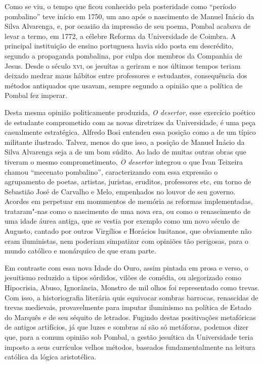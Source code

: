 Como se viu, o tempo que ficou conhecido pela posteridade como ``período
pombalino'' teve início em 1750, um ano após o nascimento de Manuel Inácio da
Silva Alvarenga, e, por ocasião da impressão de seu poema, Pombal acabava de
levar a termo, em 1772, a célebre Reforma da Universidade de Coimbra. A
principal instituição de ensino portuguesa havia sido posta em descrédito,
segundo a propaganda pombalina, por culpa dos membros da Companhia de Jesus.
Desde o século \textsc{xvi}, os jesuítas a geriram e nos últimos tempos teriam
deixado medrar maus hábitos entre professores e estudantes, consequência dos
métodos antiquados que usavam, sempre segundo a opinião que a política de Pombal
fez imperar. 

Desta mesma opinião politicamente produzida, \textit{O desertor},
esse exercício poético de estudante comprometido com as novas diretrizes da
Universidade, é uma peça casualmente estratégica. Alfredo Bosi entendeu essa
posição como a de um típico militante ilustrado. Talvez, menos do que isso, a
posição de Manuel Inácio da Silva Alvarenga seja a de um bom súdito.  Ao lado de
muitas outras obras que tiveram o mesmo comprometimento, \textit{O desertor}
integrou o que Ivan Teixeira chamou ``mecenato pombalino'', caracterizando com
essa expressão o agrupamento de poetas, artistas, juristas, eruditos,
professores etc, em torno de Sebastião José de Carvalho e Melo, empenhados no
louvor de seu governo.  Acordes em perpetuar em monumentos de memória as
reformas implementadas, trataram"-nas como o nascimento de uma nova era, ou como
o renascimento de uma idade áurea antiga, que se vestia por exemplo como um novo
século de Augusto, cantado por outros Virgílios e Horácios lusitanos, que
obviamente não eram iluministas, nem poderiam simpatizar com opiniões tão
perigosas, para o mundo católico e monárquico de que eram parte.

Em contraste com essa nova Idade do Ouro, assim pintada em prosa e verso, o
jesuitismo reduzido a tipos sórdidos, vilões de comédia, ou alegorizado como
Hipocrisia, Abuso, Ignorância, Monstro de mil olhos foi representado como
trevas. Com isso, a historiografia literária quis equivocar sombras barrocas,
renascidas de trevas medievais, provavelmente para imputar iluminismo na
política de Estado do Marquês e de seu séquito de letrados.  Fugindo destas
positivações metafóricas de antigos artifícios, já que luzes e sombras aí são só
metáforas, podemos dizer que, para a comum opinião sob Pombal, a gestão
jesuítica da Universidade teria imposto a seus currículos velhos métodos,
baseados fundamentalmente na leitura católica da lógica aristotélica.


